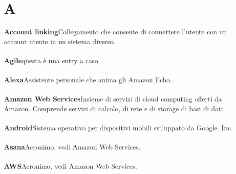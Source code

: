 \newpage
\section{A}\label{l:A}
\textbf{Account linking}\newline Collegamento che consente di connettere l'utente con un account utente in un sistema diverso.\\\\

\textbf{Agile}\newline questa è una entry a caso\\\\

\textbf{Alexa}\newline Assistente personale che anima gli Amazon Echo.\\\\

\textbf{Amazon Web Services}\newline Insieme di servizi di cloud computing offerti da Amazon. Comprende servizi di calcolo, di rete e di storage di basi di dati.\\\\

\textbf{Android}\newline Sistema operativo per dispositivi mobili sviluppato da Google.
Inc.\\\\

\textbf{Asana}\newline Acronimo, vedi Amazon Web Services.\\\\

\textbf{AWS}\newline Acronimo, vedi Amazon Web Services.

